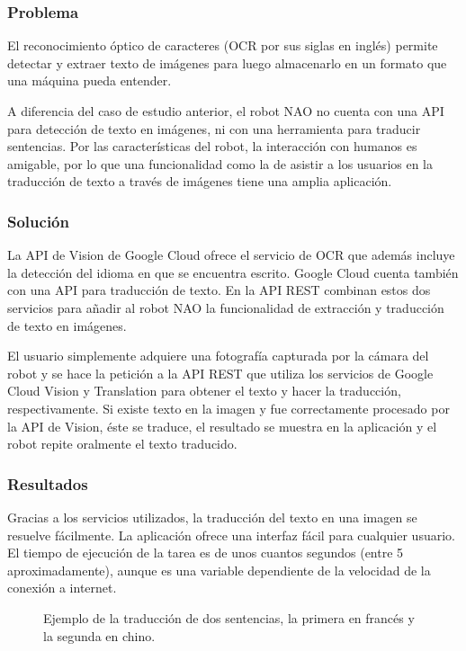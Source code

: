 \subsubsection{Problema}

El reconocimiento óptico de caracteres (OCR por sus siglas en inglés) permite detectar y extraer texto de imágenes para luego
almacenarlo en un formato que una máquina pueda entender.

A diferencia del caso de estudio anterior, el robot NAO
no cuenta con una API para detección de
texto en imágenes, ni con una herramienta
para traducir sentencias. Por las características
del robot, la interacción con humanos es 
amigable, por lo que una funcionalidad como la de asistir
a los usuarios en la traducción de texto a través
de imágenes tiene una amplia aplicación.

\subsubsection{Solución}


La API de Vision de Google Cloud ofrece el servicio de OCR
que además incluye la detección del idioma en que se encuentra escrito.
Google Cloud cuenta también con una API para traducción de 
texto.
En la API REST combinan estos dos servicios
para añadir al robot NAO la funcionalidad de extracción y traducción de texto en imágenes. 

El usuario simplemente adquiere una fotografía
capturada por la cámara del robot y se hace la petición
a la API REST que utiliza los servicios
de Google Cloud Vision y Translation para obtener el texto
y hacer la traducción, respectivamente.
Si existe texto en la imagen y fue correctamente procesado por
la API de Vision, éste se traduce, el resultado se muestra
en la aplicación y el robot repite oralmente
el texto traducido.

\subsubsection{Resultados}

Gracias a los servicios utilizados, la traducción 
del texto en una imagen se resuelve fácilmente.
La aplicación ofrece una interfaz fácil para cualquier
usuario. El tiempo de ejecución de la tarea
es de unos cuantos segundos (entre 5 aproximadamente), aunque es
una variable dependiente de la velocidad de la conexión 
a internet.


\begin{figure}[htbp]
    \centering
    \qquad
    \caption{Ejemplo de la traducción
    de dos sentencias, la primera en francés y la segunda
    en chino.}
\end{figure}

